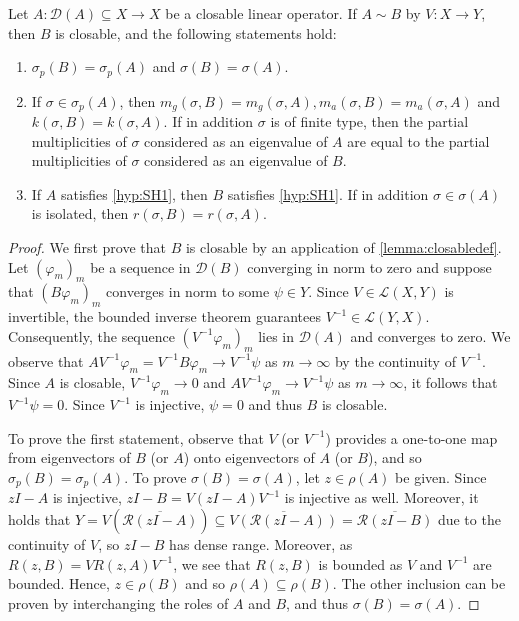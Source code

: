 \documentclass[english]{myarticle}
\begin{document}
\begin{sloppypar}
\begin{proposition} \label{prop:similarity}
Let $A: \mathcal{D}(A) \subseteq X \to X$ be a closable linear operator. If $A \sim B$ by $V : X \to Y$, then $B$ is closable, and the following statements hold:
\begin{enumerate}
    \item $\sigma_p(B) = \sigma_p(A)$ and $\sigma(B) = \sigma(A)$.
    \item If $\sigma \in \sigma_p(A)$, then $m_g(\sigma,B) = m_g(\sigma,A), m_a(\sigma,B) = m_a(\sigma,A)$ and $k(\sigma, B) = k(\sigma, A)$. If in addition $\sigma$ is of finite type, then the partial multiplicities of $\sigma$ considered as an eigenvalue of $A$ are equal to the partial multiplicities of $\sigma$ considered as an eigenvalue of $B$.
    \item If $A$ satisfies \ref{hyp:SH1}, then $B$ satisfies \ref{hyp:SH1}. If in addition $\sigma \in \sigma(A)$ is isolated, then $r(\sigma,B) = r(\sigma,A)$.
\end{enumerate}
\end{proposition}
\begin{proof}
We first prove that $B$ is closable by an application of \cref{lemma:closabledef}. Let $(\varphi_m)_m$ be a sequence in $\mathcal{D}(B)$ converging in norm to zero and suppose that $(B\varphi_m)_m$ converges in norm to some $\psi \in Y$. Since $V \in \mathcal{L}(X,Y)$ is invertible, the bounded inverse theorem guarantees $V^{-1} \in \mathcal{L}(Y,X)$. Consequently, the sequence $(V^{-1}\varphi_m)_m$ lies in $\mathcal{D}(A)$ and converges to zero. We observe that $A V^{-1} \varphi_m = V^{-1} B \varphi_m \to V^{-1}\psi$ as $m \to \infty$ by the continuity of $V^{-1}$. Since $A$ is closable, $V^{-1}\varphi_m \to 0$ and $AV^{-1}\varphi_m \to V^{-1}\psi$ as $m \to \infty$, it follows that $V^{-1}\psi = 0$. Since $V^{-1}$ is injective, $\psi = 0$ and thus $B$ is closable.

To prove the first statement, observe that $V$ (or $V^{-1}$) provides a one-to-one map from eigenvectors of $B$ (or $A$) onto eigenvectors of $A$ (or $B$), and so $\sigma_p(B) = \sigma_p(A)$. To prove $\sigma(B) = \sigma(A)$, let $z \in \rho(A)$ be given. Since $zI - A$ is injective, $zI - B = V(zI - A) V^{-1}$ is injective as well. Moreover, it holds that $Y = V(\overline{\mathcal{R}(zI-A)}) \subseteq \overline{V(\mathcal{R}(zI-A))} = \overline{\mathcal{R}(zI-B)}$ due to the continuity of $V$, so $zI - B$ has dense range. Moreover, as $R(z,B) = V R(z,A)V^{-1}$, we see that $R(z,B)$ is bounded as $V$ and $V^{-1}$ are bounded. Hence, $z \in \rho(B)$ and so $\rho(A) \subseteq \rho(B)$. The other inclusion can be proven by interchanging the roles of $A$ and $B$, and thus $\sigma(B) = \sigma(A)$. 


\end{proof}
\end{sloppypar}
\end{document}
